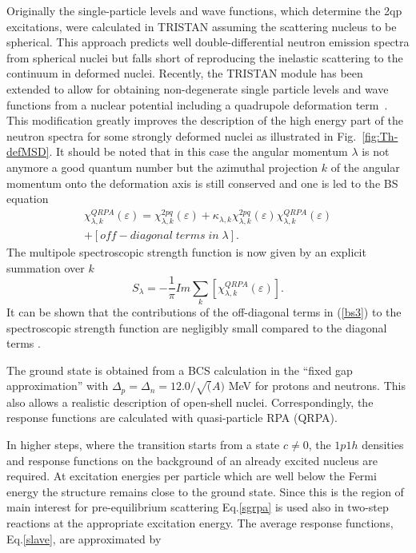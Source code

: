 \documentclass[twocolumn,amsmath,amssymb,10pt,groupedaddress,letter]{revtex4}
\begin{document}
\noindent Originally the single-particle levels and wave functions, which determine the 2qp excitations,
were calculated in TRISTAN assuming the scattering nucleus to be spherical.
This approach predicts
well double-differential neutron emission spectra from spherical nuclei but
falls short of reproducing the inelastic scattering to the continuum in deformed nuclei.
Recently, the TRISTAN module has been extended to allow for obtaining non-degenerate
single particle levels and wave functions from a nuclear potential including a quadrupole deformation term~\cite{Wienke:07}.
This modification greatly improves the description of the high energy part of the neutron spectra for some strongly deformed nuclei as illustrated in Fig.~\ref{fig:Th-defMSD}.
It should be noted that in this case the angular momentum $\lambda$ is not anymore a good quantum number
but the azimuthal projection $k$ of the angular momentum onto the deformation axis is still conserved and one is led to the BS equation
\begin{multline}
\chi_{\lambda,k}^{QRPA}(\varepsilon)=  \chi_{\lambda,k}^{2pq}(\varepsilon) + \kappa_{\lambda,k}\chi_{\lambda,k}^{2pq}(\varepsilon)\chi_{\lambda,k}^{QRPA}(\varepsilon)\\
+\left[off-diagonal\;terms\;in\;\lambda\right].\label{bs3}
\end{multline}
The multipole spectroscopic strength function is now given by an explicit summation over $k$ \begin{equation}
S_{\lambda} =-\frac{1}{\pi}Im\sum_k[\chi_{\lambda,k}^{QRPA}(\varepsilon)].\label{sgrpa}
\end{equation}
It can be shown that the contributions of the off-diagonal terms in (\ref{bs3}) to the
spectroscopic strength function are negligibly small compared to the diagonal
terms \cite{Wienke:08}.

The ground state is obtained from a BCS calculation
in the {}``fixed gap approximation'' with $\Delta_{p}=\Delta_{n}=12.0/\sqrt{(}A)$
MeV for protons and neutrons. This also allows a realistic description
of open-shell nuclei. Correspondingly, the response functions are
calculated with quasi-particle RPA (QRPA).

In higher steps, where the transition starts from a state $c\not=0$,
the $1p1h$ densities and response functions on the background of
an already excited nucleus are required. At excitation energies per
particle which are well below the Fermi energy the structure remains
close to the ground state. Since this is the region of main interest
for pre-equilibrium scattering Eq.\ref{sgrpa} is used also in two-step
reactions at the appropriate excitation energy. The
average response functions, Eq.\ref{slave}, are approximated by
\end{document}
